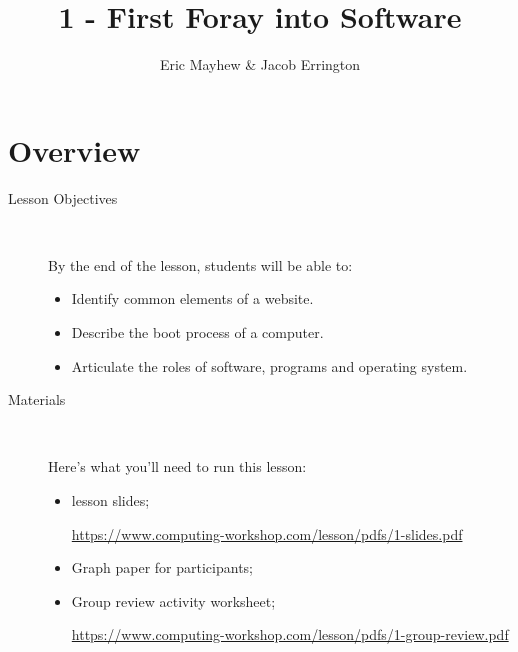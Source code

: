 \documentclass[12pt]{article}
\title{1 - First Foray into Software}
\author{Eric Mayhew \& Jacob Errington}
\date{}
\newcommand{\cwurl}{https://www.computing-workshop.com/lesson/pdfs/}
\begin{document}
\renewcommand{\abstractname}{\vspace{-\baselineskip}}
\maketitle
\begin{abstract}

\end{abstract}
\section*{Overview}
\begin{description}
  \item [Lesson Objectives] 
    ~

   By the end of the lesson, students will be able to:
  \begin{itemize}

    \item Identify common elements of a website.

    \item Describe the boot process of a computer.

    \item Articulate the roles of software, programs and operating
      system.

  \end{itemize}
  \item [Materials]~

Here's what you'll need to run this lesson:
  \begin{itemize}
    \item
      lesson slides;

      \url{\cwurl 1-slides.pdf}

    \item
      Graph paper for participants;

    \item
      Group review activity worksheet;

      \url{\cwurl 1-group-review.pdf}
  \end{itemize}
\end{description}
\end{document}
